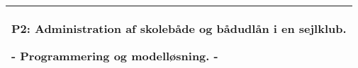


%
%
%
%
\thispagestyle{empty}
%
  \addtolength{\hoffset}{0.5\evensidemargin-0.5\oddsidemargin} %
  \noindent%
  \begin{tabular}{@{}p{\textwidth}@{}}
    \toprule[2pt]
    \midrule
    \vspace{0.2cm}
    \begin{center}
    \Huge{\textbf{
      P2: Administration af skolebåde og bådudlån i en sejlklub.%
    }}
    \end{center}
    \begin{center}
      \Large{
        - Programmering og modelløsning. -%
      }
    \end{center}
    \vspace{0.2cm}\\
    \midrule
    \toprule[2pt]
  \end{tabular}
  \vspace{4 cm}
